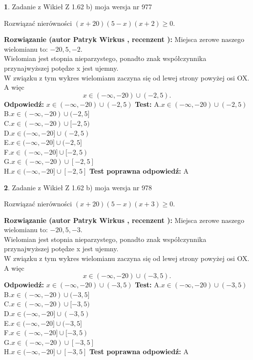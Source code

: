\documentclass[12pt, a4paper]{article}
\theoremstyle{definition} %
\newtheorem{zad}{}
\newcommand{\zadStart}[1]{\begin{zad}#1\newline}
\newcommand{\zadStop}{\end{zad}}
\newcommand{\rozwStart}[2]{\noindent \textbf{Rozwiązanie (autor #1 , recenzent #2): }\newline}
\newcommand{\rozwStop}{\newline}
\newcommand{\odpStart}{\noindent \textbf{Odpowiedź:}\newline}
\newcommand{\odpStop}{\newline}
\newcommand{\testStart}{\noindent \textbf{Test:}\newline}
\newcommand{\testStop}{\newline}
\newcommand{\kluczStart}{\noindent \textbf{Test poprawna odpowiedź:}\newline}
\newcommand{\kluczStop}{\newline}
\begin{document}
\zadStart{Zadanie z Wikieł Z 1.62 b) moja wersja nr 977}

Rozwiązać nierówności $(x+20)(5-x)(x+2)\ge0$.
\zadStop
\rozwStart{Patryk Wirkus}{}
Miejsca zerowe naszego wielomianu to: $-20, 5, -2$.\\
Wielomian jest stopnia nieparzystego, ponadto znak współczynnika przy\linebreak najwyższej potędze x jest ujemny.\\ W związku z tym wykres wielomianu zaczyna się od lewej strony powyżej osi OX. A więc $$x \in (-\infty,-20) \cup (-2,5).$$
\rozwStop
\odpStart
$x \in (-\infty,-20) \cup (-2,5)$
\odpStop
\testStart
A.$x \in (-\infty,-20) \cup (-2,5)$\\
B.$x \in (-\infty,-20) \cup (-2,5]$\\
C.$x \in (-\infty,-20) \cup [-2,5)$\\
D.$x \in (-\infty,-20] \cup (-2,5)$\\
E.$x \in (-\infty,-20] \cup (-2,5]$\\
F.$x \in (-\infty,-20] \cup [-2,5)$\\
G.$x \in (-\infty,-20) \cup [-2,5]$\\
H.$x \in (-\infty,-20] \cup [-2,5]$
\testStop
\kluczStart
A
\kluczStop



\zadStart{Zadanie z Wikieł Z 1.62 b) moja wersja nr 978}

Rozwiązać nierówności $(x+20)(5-x)(x+3)\ge0$.
\zadStop
\rozwStart{Patryk Wirkus}{}
Miejsca zerowe naszego wielomianu to: $-20, 5, -3$.\\
Wielomian jest stopnia nieparzystego, ponadto znak współczynnika przy\linebreak najwyższej potędze x jest ujemny.\\ W związku z tym wykres wielomianu zaczyna się od lewej strony powyżej osi OX. A więc $$x \in (-\infty,-20) \cup (-3,5).$$
\rozwStop
\odpStart
$x \in (-\infty,-20) \cup (-3,5)$
\odpStop
\testStart
A.$x \in (-\infty,-20) \cup (-3,5)$\\
B.$x \in (-\infty,-20) \cup (-3,5]$\\
C.$x \in (-\infty,-20) \cup [-3,5)$\\
D.$x \in (-\infty,-20] \cup (-3,5)$\\
E.$x \in (-\infty,-20] \cup (-3,5]$\\
F.$x \in (-\infty,-20] \cup [-3,5)$\\
G.$x \in (-\infty,-20) \cup [-3,5]$\\
H.$x \in (-\infty,-20] \cup [-3,5]$
\testStop
\kluczStart
A
\kluczStop
\end{document}
